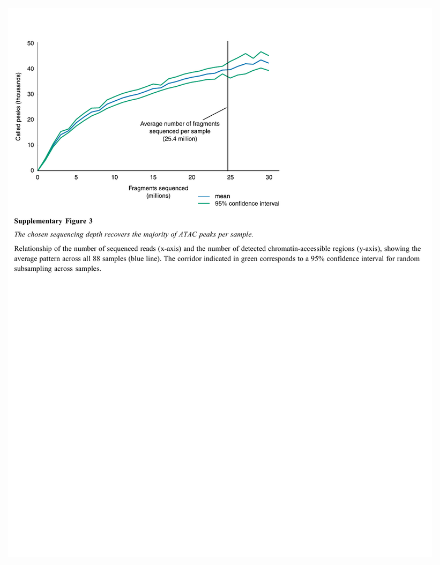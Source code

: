 \documentclass[10pt,]{article}
\begin{document}
\begin{figure}
\centering
\includegraphics[width=1.000\hsize]{figures/Supplementary_Information_03.pdf}
\end{figure}
\clearpage
\end{document}
